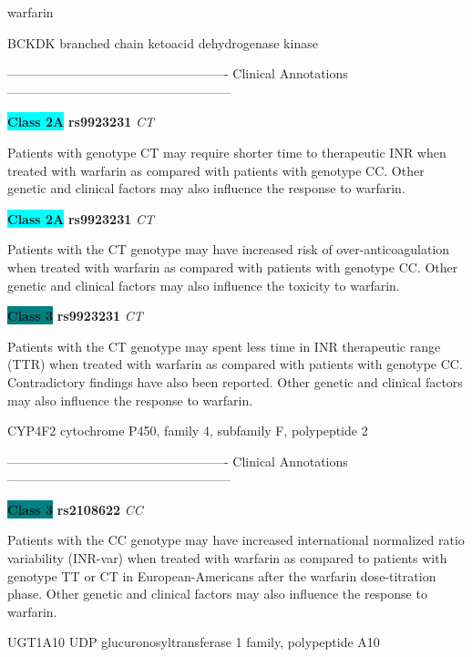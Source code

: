 \documentclass{resume} %
\begin{document}
\begin{rSection}{ warfarin }
\begin{rSubsection}{ BCKDK }{ branched chain ketoacid dehydrogenase kinase }{}{}
\item[] ---------------------------------------------------- Clinical Annotations -----------------------------------------------------\newline
\item \textbf{\colorbox{cyan} {Class 2A}} \textbf{ rs9923231 } \textit{ CT }
\item[] Patients with genotype CT may require shorter time to therapeutic INR when treated with warfarin as compared with patients with genotype CC. Other genetic and clinical factors may also influence the response to warfarin. \item \textbf{\colorbox{cyan} {Class 2A}} \textbf{ rs9923231 } \textit{ CT }
\item[] Patients with the CT genotype may have increased risk of over-anticoagulation when treated with warfarin as compared with patients with genotype CC. Other genetic and clinical factors may also influence the toxicity to warfarin.\item \textbf{\colorbox{teal} {Class 3}} \textbf{ rs9923231 } \textit{ CT }
\item[] Patients with the CT genotype may spent less time in INR therapeutic range (TTR) when treated with warfarin as compared with patients with genotype CC. Contradictory findings have also been reported. Other genetic and clinical factors may also influence the response to warfarin.
\end{rSubsection}\begin{rSubsection}{ CYP4F2 }{ cytochrome P450, family 4, subfamily F, polypeptide 2 }{}{}
\item[]

\item[] ---------------------------------------------------- Clinical Annotations -----------------------------------------------------\newline
\item \textbf{\colorbox{teal} {Class 3}} \textbf{ rs2108622 } \textit{ CC }
\item[] Patients with the CC genotype may have increased international normalized ratio variability (INR-var) when treated with warfarin as compared to patients with genotype TT or CT in European-Americans after the warfarin dose-titration phase. Other genetic and clinical factors may also influence the response to warfarin.
\end{rSubsection}\begin{rSubsection}{ UGT1A10 }{ UDP glucuronosyltransferase 1 family, polypeptide A10 }{}{}
\item[]


\end{rSubsection}
\end{rSection}
\end{document}
